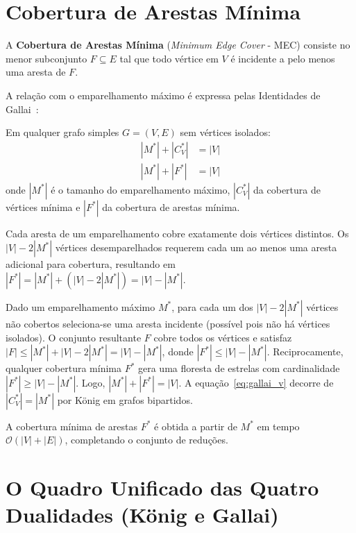 \section{Cobertura de Arestas Mínima}\label{sec:cobertura_arcos}

A \textbf{Cobertura de Arestas Mínima} (\textit{Minimum Edge Cover} - MEC) consiste no menor subconjunto $F \subseteq E$ tal que todo vértice em $V$ é incidente a pelo menos uma aresta de $F$.

A relação com o emparelhamento máximo é expressa pelas Identidades de Gallai~\cite{bondy2008graph}:

\begin{teorema}
Em qualquer grafo simples $G = (V, E)$ sem vértices isolados:
\begin{align}
    |M^*| + |C_V^*| &= |V| \label{eq:gallai_v} \\
    |M^*| + |F^*| &= |V| \label{eq:gallai_e}
\end{align}
onde $|M^*|$ é o tamanho do emparelhamento máximo, $|C_V^*|$ da cobertura de vértices mínima e $|F^*|$ da cobertura de arestas mínima.
\end{teorema}

 Cada aresta de um emparelhamento cobre exatamente dois vértices distintos. Os $|V| - 2|M^*|$ vértices desemparelhados requerem cada um ao menos uma aresta adicional para cobertura, resultando em $|F^*| = |M^*| + (|V| - 2|M^*|) = |V| - |M^*|$.

\begin{demonstracao}
Dado um emparelhamento máximo $M^*$, para cada um dos $|V| - 2|M^*|$ vértices não cobertos seleciona-se uma aresta incidente (possível pois não há vértices isolados). O conjunto resultante $F$ cobre todos os vértices e satisfaz $|F| \le |M^*| + |V| - 2|M^*| = |V| - |M^*|$, donde $|F^*| \le |V| - |M^*|$. Reciprocamente, qualquer cobertura mínima $F^*$ gera uma floresta de estrelas com cardinalidade $|F^*| \ge |V| - |M^*|$. Logo, $|M^*| + |F^*| = |V|$. A equação~\eqref{eq:gallai_v} decorre de $|C_V^*| = |M^*|$ por König em grafos bipartidos.
\end{demonstracao}

A cobertura mínima de arestas $F^*$ é obtida a partir de $M^*$ em tempo $\mathcal{O}(|V| + |E|)$, completando o conjunto de reduções.


\section{O Quadro Unificado das Quatro Dualidades (König e Gallai)}

